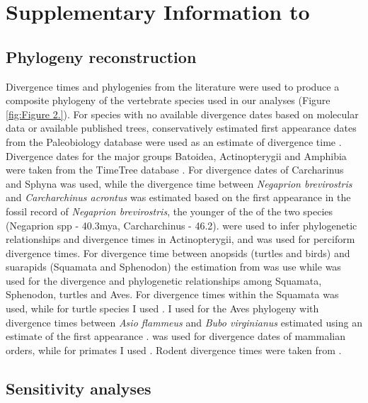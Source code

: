 \chapter{Supplementary Information to }%
\label{chap:Appendix A}
\section{Phylogeny reconstruction}

Divergence times and phylogenies from the literature were used to produce a composite phylogeny of the vertebrate species used in our analyses (Figure \ref{fig:Figure 2.}). For species with no available divergence dates based on molecular data or available published trees, conservatively estimated first appearance dates from the Paleobiology database were used as an estimate of divergence time \citep{alroy2008phanerozoic}. 
Divergence dates for the major groups Batoidea, Actinopterygii and Amphibia were taken from the TimeTree database \citep{hedges2006timetree}. For divergence dates of Carcharinus and Sphyna \cite{lim2010phylogeny} was used, while the divergence time between \textit{Negaprion brevirostris} and \textit{Carcharchinus acrontus} was estimated based on the first appearance in the fossil record of \textit{Negaprion brevirostris}, the younger of the of the two species (Negaprion spp - 40.3mya, Carcharchinus - 46.2). \cite{li2008optimal} were used to infer phylogenetic relationships and divergence times in Actinopterygii, and \cite{little2010evolutionary} was used for perciform divergence times. For divergence time between anopsids (turtles and birds) and suarapids (Squamata and Sphenodon) the estimation from \cite{benton2007paleontological} was use while \cite{perelman2011molecular} was used for the divergence and phylogenetic relationships among Squamata, Sphenodon, turtles and Aves. For divergence times within the Squamata \cite{wiens2006does} was used, while for turtle species I used \cite{naro2008evolutionary}. I used \cite{brown2008strong} for the Aves phylogeny with divergence times between \textit{Asio flammeus} and \textit{Bubo virginianus} estimated using an estimate of the first appearance \citep{janossy2011pleistocene}. \cite{murphy2007using} was used for divergence dates of mammalian orders, while for primates I used \cite{perelman2011molecular}. Rodent divergence times were taken from \cite{murphy2007using}.



\section{Sensitivity analyses}

